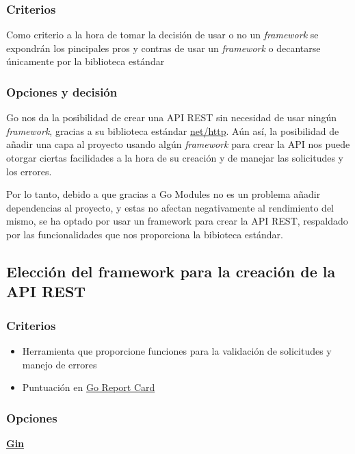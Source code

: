 \subsubsection{Criterios}

Como criterio a la hora de tomar la decisión de usar o no un \textit{framework} se expondrán los pincipales pros y contras de usar un \textit{framework} o decantarse únicamente por la biblioteca estándar

\subsubsection{Opciones y decisión}

Go nos da la posibilidad de crear una API REST sin necesidad de usar ningún \textit{framework}, gracias a su biblioteca estándar \href{https://pkg.go.dev/net/http}{net/http}.
Aún así, la posibilidad de añadir una capa al proyecto usando algún \textit{framework} para crear la API nos puede otorgar ciertas facilidades a la hora de su creación y de manejar las solicitudes y los errores.

Por lo tanto, debido a que gracias a Go Modules no es un problema añadir dependencias al proyecto, y estas no afectan negativamente al rendimiento del mismo, se ha optado por usar
un framework para crear la API REST, respaldado por las funcionalidades que nos proporciona la bibioteca estándar.

\subsection{Elección del framework para la creación de la API REST}

\subsubsection{Criterios}

\begin{itemize}
\item
  Herramienta que proporcione funciones para la validación de solicitudes y manejo de errores
\item
  Puntuación en \href{https://goreportcard.com/}{Go Report Card}
\end{itemize}

\subsubsection{Opciones}

\textbf{\href{https://pkg.go.dev/github.com/gin-gonic/gin}{Gin}}

